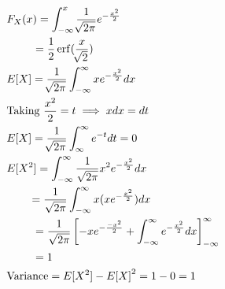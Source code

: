 \documentclass[journal,12pt,twocolumn]{IEEEtran}
\DeclareMathOperator\erf{erf}
\renewcommand\thesection{\arabic{section}}
\begin{document}
\begin{enumerate}[label=\thesection.\arabic*
,ref=\thesection.\theenumi]
\begin{align}
        &F_X(x) = \int_{-\infty}^{x} \frac{1}{\sqrt[]{2\pi}}e^{-\frac{x^2}{2}}\\
        &~~~~~~~= \frac{1}{2} \erf (\frac{x}{\sqrt[]{2}})\\
        &E[X] = \frac{1}{\sqrt[]{2\pi}}\int_{-\infty}^{\infty}xe^{-\frac{x^2}{2}}dx\\
        &\text{Taking  }\frac{x^2}{2} = t \implies x dx = dt\\
        &E[X] = \frac{1}{\sqrt[]{2\pi}}\int_{\infty}^{\infty}e^{-t}dt = 0\\
        &E[X^2]=\int_{-\infty}^{\infty} \frac{1}{\sqrt{2\pi}} x^2e^{-\frac{x^2}{2}} dx\\
        &~~~~~~=\frac{1}{\sqrt{2\pi}}\int_{-\infty}^{\infty}  x(xe^{-\frac{x^2}{2}}) dx\\
        &~~~~~~~= \frac{1}{\sqrt{2\pi}} \sbrak{-xe^{-\frac{-x^2}{2}}+\int_{-\infty}^{\infty} e^{-\frac{x^2}{2}} dx}^{\infty}_{-\infty}\\
        &~~~~~~~= 1\\
        &\text{Variance} = E[X^2] - {E[X]}^2 = 1 - 0 = 1
    \end{align}
    \end{enumerate}
\end{document}
